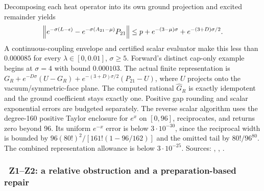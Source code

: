 Decomposing each heat operator into its own ground projection and excited
remainder yields
\begin{equation}
 \left\lVert e^{-\sigma(L-\epsilon)}-e^{-\sigma(A_{21}-\mu)}P_{21}\right\rVert
 \le p+e^{-(3-\mu)\sigma}+e^{-(3+D)\sigma/2}.
 \label{recent:late21}
\end{equation}
A continuous-coupling envelope and certified scalar evaluator make this less
than $0.000085$ for every $\lambda\in[0,0.01]$, $\sigma\ge5$.  Forward's distinct
cap-only example begins at $\sigma=4$ with bound $0.000103$.
The actual finite representation is
$G_R+e^{-D\sigma}(U-G_R)+e^{-(3+D)\sigma/2}(P_{21}-U)$, where $U$ projects
onto the vacuum/symmetric-face plane.  The computed rational $\widehat G_R$ is
exactly idempotent and the ground coefficient stays exactly one.  Positive
gap rounding and scalar exponential errors are budgeted separately.  The
reverse scalar algorithm uses the degree-160 positive Taylor enclosure for
$e^x$ on $[0,96]$, reciprocates, and returns zero beyond 96.  Its uniform
$e^{-x}$ error is below $3\cdot10^{-30}$, since the reciprocal width is bounded
by $96(80!)^2/[161!(1-96/162)]$ and the omitted tail by $80!/96^{80}$.
The combined representation allowance is below $3\cdot10^{-25}$.
Sources: ,
,
.

\subsubsection{\workstar\ Z1--Z2: a relative obstruction and a preparation-based repair}

